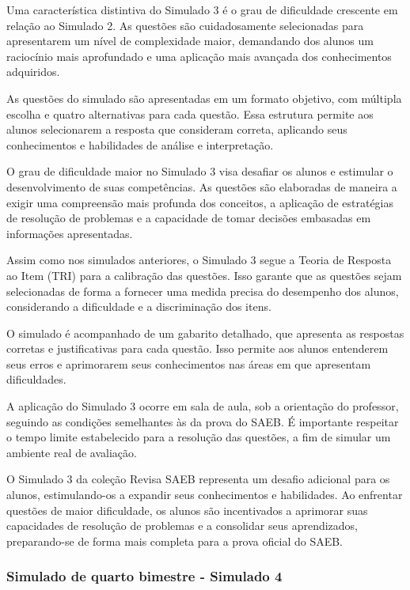 Uma característica distintiva do Simulado 3 é o grau de dificuldade
crescente em relação ao Simulado 2. As questões são cuidadosamente
selecionadas para apresentarem um nível de complexidade maior,
demandando dos alunos um raciocínio mais aprofundado e uma aplicação
mais avançada dos conhecimentos adquiridos.

As questões do simulado são apresentadas em um formato objetivo, com
múltipla escolha e quatro alternativas para cada questão. Essa estrutura
permite aos alunos selecionarem a resposta que consideram correta,
aplicando seus conhecimentos e habilidades de análise e interpretação.

O grau de dificuldade maior no Simulado 3 visa desafiar os alunos e
estimular o desenvolvimento de suas competências. As questões são
elaboradas de maneira a exigir uma compreensão mais profunda dos
conceitos, a aplicação de estratégias de resolução de problemas e a
capacidade de tomar decisões embasadas em informações apresentadas.

Assim como nos simulados anteriores, o Simulado 3 segue a Teoria de
Resposta ao Item (TRI) para a calibração das questões. Isso garante que
as questões sejam selecionadas de forma a fornecer uma medida precisa do
desempenho dos alunos, considerando a dificuldade e a discriminação dos
itens.

O simulado é acompanhado de um gabarito detalhado, que apresenta as
respostas corretas e justificativas para cada questão. Isso permite aos
alunos entenderem seus erros e aprimorarem seus conhecimentos nas áreas
em que apresentam dificuldades.

A aplicação do Simulado 3 ocorre em sala de aula, sob a orientação do
professor, seguindo as condições semelhantes às da prova do SAEB. É
importante respeitar o tempo limite estabelecido para a resolução das
questões, a fim de simular um ambiente real de avaliação.

O Simulado 3 da coleção Revisa SAEB representa um desafio adicional para os alunos,
estimulando-os a expandir seus conhecimentos e habilidades. Ao enfrentar
questões de maior dificuldade, os alunos são incentivados a aprimorar
suas capacidades de resolução de problemas e a consolidar seus
aprendizados, preparando-se de forma mais completa para a prova oficial
do SAEB.

\subsubsection{Simulado de quarto bimestre - Simulado
4}\label{simulado-de-quarto-bimestre---simulado-4}

